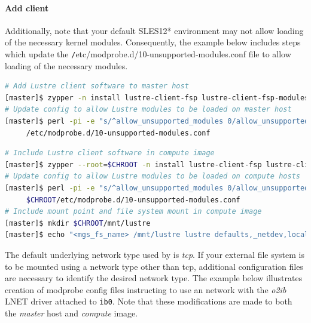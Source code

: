 \documentclass[letterpaper]{article}
\newcommand{\baseOS}{SLES12*}
\begin{document}
\paragraph{Add \Lustre{} client} \label{sec:lustre_client}


Additionally, note that your default \baseOS{} environment may not allow loading of
the necessary \Lustre{} kernel modules. Consequently, the example below includes
steps which update the {\texttt /etc/modprobe.d/10-unsupported-modules.conf}
file to allow loading of the necessary modules.

\begin{lstlisting}[language=bash,keywords={},upquote=true]
# Add Lustre client software to master host
[master]$ zypper -n install lustre-client-fsp lustre-client-fsp-modules
# Update config to allow Lustre modules to be loaded on master host
[master]$ perl -pi -e "s/^allow_unsupported_modules 0/allow_unsupported_modules 1/" \
     /etc/modprobe.d/10-unsupported-modules.conf
\end{lstlisting}

\begin{lstlisting}[language=bash,keywords={},upquote=true]
# Include Lustre client software in compute image
[master]$ zypper --root=$CHROOT -n install lustre-client-fsp lustre-client-fsp-modules
# Update config to allow Lustre modules to be loaded on compute hosts
[master]$ perl -pi -e "s/^allow_unsupported_modules 0/allow_unsupported_modules 1/" \
     $CHROOT/etc/modprobe.d/10-unsupported-modules.conf
# Include mount point and file system mount in compute image
[master]$ mkdir $CHROOT/mnt/lustre
[master]$ echo "<mgs_fs_name> /mnt/lustre lustre defaults,_netdev,localflock 0 0" >> $CHROOT/etc/fstab
\end{lstlisting}

The default underlying network type used by \Lustre{} is {\em tcp}. If your
external \Lustre{} file system is to be mounted using a network type other than
tcp, additional configuration files are necessary to identify the desired
network type. The example below illustrates creation of modprobe config files
instructing \Lustre{} to use an \InfiniBand{} network with the {\em o2ib} LNET driver
attached to \texttt{ib0}. Note that these modifications are made to both the
{\em master} host and {\em compute} image.
\end{document}
